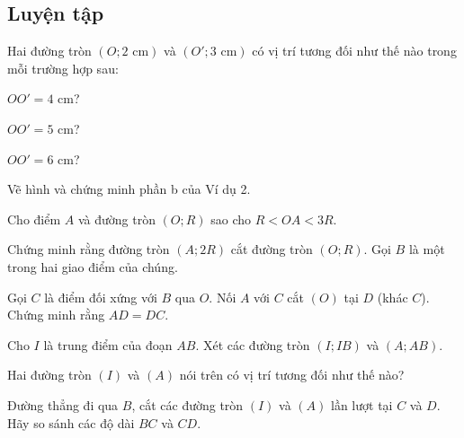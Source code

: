 \begin{practice}
    \subsection{Luyện tập}

    \begin{questions}[resume=SBT]
        \item Hai đường tròn $(O;2\text{ cm})$ và $(O';3\text{ cm})$ có vị trí tương đối như thế nào trong mỗi trường hợp sau:
        \begin{questions}
            \item $OO'=4$ cm?

            \answerline
            \item $OO'=5$ cm?

            \answerline
            \item $OO'=6$ cm?

            \answerline
        \end{questions}

        \item Vẽ hình và chứng minh phần b của Ví dụ 2.

        \answerline
        \answerline
        \answerline

        \item Cho điểm $A$ và đường tròn $(O;R)$ sao cho $R<OA<3R$.
        \begin{questions}
            \item Chứng minh rằng đường tròn $(A;2R)$ cắt đường tròn $(O;R)$. Gọi $B$ là một trong hai giao điểm của chúng.

            \answerline
            \answerline
            \item Gọi $C$ là điểm đối xứng với $B$ qua $O$. Nối $A$ với $C$ cắt $(O)$ tại $D$ (khác $C$). Chứng minh rằng $AD=DC$.

            \answerline
            \answerline
            \answerline
        \end{questions}

        \item Cho $I$ là trung điểm của đoạn $AB$. Xét các đường tròn $(I;IB)$ và $(A;AB)$.
        \begin{questions}
            \item Hai đường tròn $(I)$ và $(A)$ nói trên có vị trí tương đối như thế nào?

            \answerline
            \item Đường thẳng đi qua $B$, cắt các đường tròn $(I)$ và $(A)$ lần lượt tại $C$ và $D$. Hãy so sánh các độ dài $BC$ và $CD$.


\end{questions}
\end{questions}
\end{practice}
